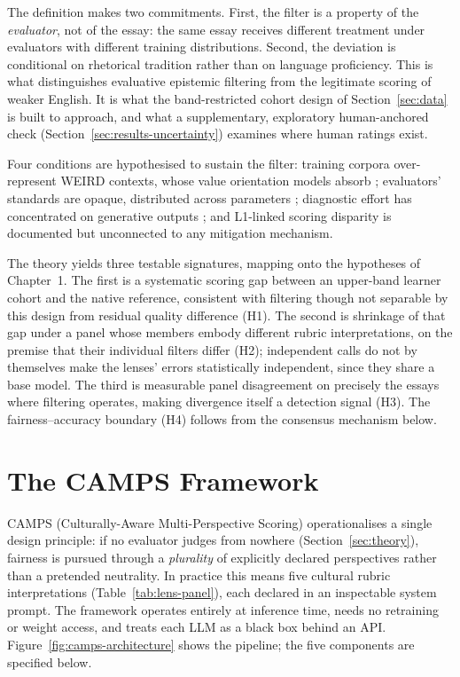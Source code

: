 The definition makes two commitments. First, the filter is a property
of the \emph{evaluator}, not of the essay: the same essay receives
different treatment under evaluators with different training
distributions. Second, the deviation is conditional on rhetorical
tradition rather than on language proficiency. This is what
distinguishes evaluative epistemic filtering from the legitimate
scoring of weaker English. It is what the band-restricted cohort
design of Section~\ref{sec:data} is built to approach, and what a
supplementary, exploratory human-anchored check
(Section~\ref{sec:results-uncertainty}) examines where human ratings
exist.

Four conditions are hypothesised to sustain the filter: training
corpora over-represent WEIRD contexts, whose value orientation
models absorb \citep{tao2024cultural}; evaluators' standards are
opaque, distributed across parameters \citep{vajjala2018automated,
gallegos2024bias}; diagnostic effort has concentrated on generative
outputs \citep{dorleon2026uncovering}; and L1-linked scoring
disparity is documented \citep{gayed2026firstlanguage} but
unconnected to any mitigation mechanism.

The theory yields three testable signatures, mapping onto the
hypotheses of Chapter~1. The first is a systematic scoring gap between an
upper-band learner cohort and the native reference, consistent with
filtering though not separable by this design from residual quality
difference (H1). The second is shrinkage
of that gap under a panel whose members embody different rubric
interpretations, on the premise that their individual filters differ
(H2); independent calls do not by themselves make the lenses'
errors statistically independent, since they share a base model. The third is measurable panel disagreement on precisely the
essays where filtering operates, making divergence itself a detection
signal (H3). The fairness--accuracy boundary (H4) follows from the
consensus mechanism below.

\section{The CAMPS Framework}
\label{sec:camps-framework}

CAMPS (Culturally-Aware Multi-Perspective Scoring) operationalises a
single design principle: if no evaluator judges from nowhere
(Section~\ref{sec:theory}), fairness is pursued through a
\emph{plurality} of explicitly declared perspectives rather than a
pretended neutrality. In practice this means five cultural rubric interpretations
(Table~\ref{tab:lens-panel}), each declared in an inspectable system
prompt. The framework operates entirely at inference time, needs no
retraining or weight access, and treats each LLM as a black box
behind an API. Figure~\ref{fig:camps-architecture} shows the
pipeline; the five components are specified below.

